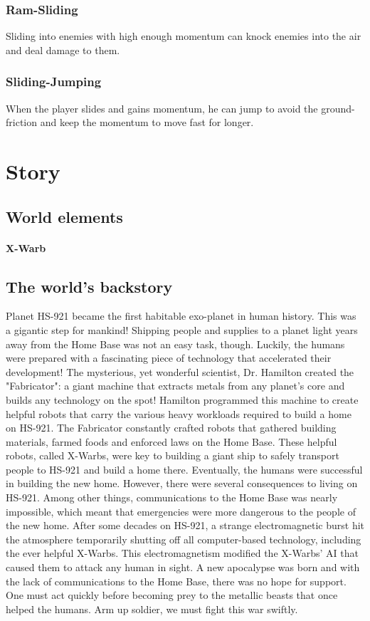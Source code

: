 \documentclass[12pt]{article}
\begin{document}
\subsubsection{Ram-Sliding}

Sliding into enemies with high enough momentum can knock enemies into the air and deal damage to them. 

\subsubsection{Sliding-Jumping}

When the player slides and gains momentum, he can jump to avoid the ground-friction and keep the momentum to move fast for longer.


\section{Story}

\subsection{World elements}

\paragraph{X-Warb} 


\subsection{The world's backstory}

Planet HS-921 became the first habitable exo-planet in human history. This was a gigantic step for mankind! Shipping people and supplies to a planet light years away from the Home Base was not an easy task, though. Luckily, the humans were prepared with a fascinating piece of technology that accelerated their development! The mysterious, yet wonderful scientist, Dr. Hamilton created the "Fabricator": a giant machine that extracts metals from any planet's core and builds any technology on the spot! Hamilton programmed this machine to create helpful robots that carry the various heavy workloads required to build a home on HS-921. The Fabricator constantly crafted robots that gathered building materials, farmed foods and enforced laws on the Home Base. These helpful robots, called X-Warbs, were key to building a giant ship to safely transport people to HS-921 and build a home there. Eventually, the humans were successful in building the new home. However, there were several consequences to living on HS-921. Among other things, communications to the Home Base was nearly impossible, which meant that emergencies were more dangerous to the people of the new home. After some decades on HS-921, a strange electromagnetic burst hit the atmosphere temporarily shutting off all computer-based technology, including the ever helpful X-Warbs. This electromagnetism modified the X-Warbs' AI that caused them to attack any human in sight. A new apocalypse was born and with the lack of communications to the Home Base, there was no hope for support. One must act quickly before becoming prey to the metallic beasts that once helped the humans. Arm up soldier, we must fight this war swiftly. 
\end{document}

